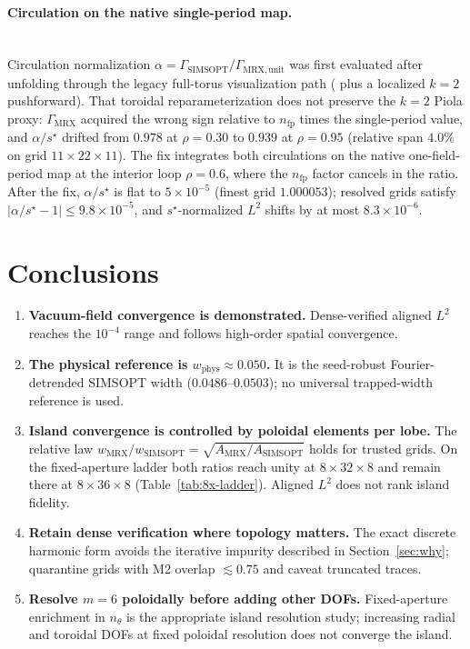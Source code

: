 \documentclass[11pt,a4paper]{article}
\begin{document}
\paragraph{Circulation on the native single-period map.}
\leavevmode\\[-0.35em]
Circulation normalization
\(\alpha=\Gamma_{\mathrm{SIMSOPT}}/\Gamma_{\mathrm{MRX,unit}}\) was first
evaluated after unfolding through the legacy full-torus visualization path
( plus a localized \(k=2\) pushforward).
That toroidal reparameterization does not preserve the \(k=2\) Piola proxy:
\(\Gamma_{\mathrm{MRX}}\) acquired the wrong sign relative to
\(n_{\mathrm{fp}}\) times the single-period value, and \(\alpha/s^\star\)
drifted from \(0.978\) at \(\rho=0.30\) to \(0.939\) at \(\rho=0.95\)
(relative span \(4.0\%\) on grid \(11\times22\times11\)).  The fix integrates
both circulations on the native one-field-period map at the interior loop
\(\rho=0.6\), where the \(n_{\mathrm{fp}}\) factor cancels in the ratio.
After the fix, \(\alpha/s^\star\) is flat to \(5\times10^{-5}\) (finest grid
\(1.000053\)); resolved grids satisfy
\(\lvert\alpha/s^\star-1\rvert\le9.8\times10^{-5}\), and
\(s^\star\)-normalized \(L^2\) shifts by at most \(8.3\times10^{-6}\).

\section{Conclusions}

\begin{enumerate}[leftmargin=1.5em,itemsep=0.25em]
  \item \textbf{Vacuum-field convergence is demonstrated.}  Dense-verified
  aligned \(L^2\) reaches the \(10^{-4}\) range and follows high-order spatial
  convergence.
  \item \textbf{The physical reference is \(w_{\mathrm{phys}}\approx0.050\).}
  It is the seed-robust Fourier-detrended SIMSOPT width
  (\(0.0486\)--\(0.0503\)); no universal trapped-width reference is used.
  \item \textbf{Island convergence is controlled by poloidal elements per
  lobe.}  The relative law
  \(w_{\mathrm{MRX}}/w_{\mathrm{SIMSOPT}}=\sqrt{A_{\mathrm{MRX}}/A_{\mathrm{SIMSOPT}}}\)
  holds for trusted grids.  On the fixed-aperture ladder both ratios reach
  unity at \(8\times32\times8\) and remain there at \(8\times36\times8\)
  (Table~\ref{tab:8x-ladder}).  Aligned \(L^2\) does not rank island
  fidelity.
  \item \textbf{Retain dense verification where topology matters.}  The exact
  discrete harmonic form avoids the iterative impurity described in
  Section~\ref{sec:why}; quarantine grids with M2 overlap
  \(\lesssim0.75\) and caveat truncated traces.
  \item \textbf{Resolve \(m=6\) poloidally before adding other DOFs.}
  Fixed-aperture enrichment in \(n_\theta\) is the appropriate island
  resolution study; increasing radial and toroidal DOFs at fixed poloidal
  resolution does not converge the island.
\end{enumerate}
\end{document}
